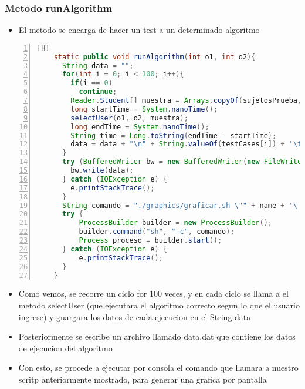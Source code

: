 \subsubsection{Metodo runAlgorithm}
\begin{itemize}
  \item El metodo se encarga de hacer un test a un determinado algoritmo
\end{itemize}
\begin{lstlisting}[language=java, caption={Testear algoritmo}, numbers=left, firstnumber=1][H]
    static public void runAlgorithm(int o1, int o2){
      String data = "";
      for(int i = 0; i < 100; i++){
        if(i == 0)
          continue;
        Reader.Student[] muestra = Arrays.copyOf(sujetosPrueba, testCases[i]);
        long startTime = System.nanoTime();
        selectUser(o1, o2, muestra);
        long endTime = System.nanoTime();
        String time = Long.toString(endTime - startTime);
        data = data + "\n" + String.valueOf(testCases[i]) + "\t" + time;
      }
      try (BufferedWriter bw = new BufferedWriter(new FileWriter("./graphics/input/data.dat"))) {
        bw.write(data);
      } catch (IOException e) {
        e.printStackTrace();
      }
      String comando = "./graphics/graficar.sh \"" + name + "\" ./graphics/input/data.dat";
      try {
          ProcessBuilder builder = new ProcessBuilder();
          builder.command("sh", "-c", comando);
          Process proceso = builder.start();
      } catch (IOException e) {
          e.printStackTrace();
      }
    }
\end{lstlisting}


\begin{itemize}
  \item Como vemos, se recorre un ciclo for 100 veces, y en cada ciclo se llama a el metodo selectUser (que ejecutara el algoritmo correcto segun lo que el usuario ingrese) y guargara los datos de cada ejecucion en el String data
  \item Posteriormente se escribe un archivo llamado data.dat que contiene los datos de ejecucion del algoritmo 
  \item Con esto, se procede a ejecutar por consola el comando que llamara a nuestro scritp anteriormente mostrado, para generar una grafica por pantalla
\end{itemize}
